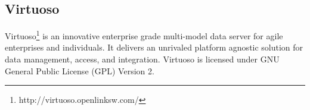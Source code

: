 \subsection{Virtuoso}
\label{sec:Sesame}
Virtuoso\footnote{http://virtuoso.openlinksw.com/} is an innovative enterprise grade multi-model data server for agile enterprises and individuals.
It delivers an unrivaled  platform agnostic solution for data management, access, and integration.
Virtuoso is licensed under GNU General Public License (GPL) Version 2.
